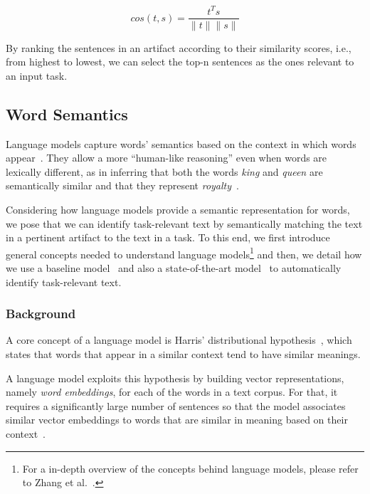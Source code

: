 \begin{equation}
    cos(t,s) = \frac{t^Ts}{\|t\| \|s\|}
    \label{eq:lex-sim}
\end{equation}
\smallskip

By ranking the sentences in an artifact according to their similarity scores, i.e., from highest to lowest,
we can  select the top-n sentences as the ones relevant to an input task.




\subsection{Word Semantics}


Language models capture words' semantics based on the context in which words appear~\cite{harris1954distributional}.
They allow a more ``human-like reasoning'' even when words are lexically different, as in 
inferring that both the words \textit{king} and \textit{queen} are semantically similar and that they represent \textit{royalty}~\cite{Mikolov2013}.


Considering how language models provide a semantic representation for words, we pose that we can identify task-relevant text by semantically matching the text in a pertinent artifact to the text in a task.
To this end, we first introduce general concepts needed to understand language models\footnote{
    For a in-depth overview of the concepts behind language models, please refer to Zhang et al.~\cite{zhang2021deep-learning}.
} and then, we detail how we use a baseline model~\cite{Mikolov2013} and also a state-of-the-art model~\cite{Devlin2018Bert} to automatically identify task-relevant text.





\subsubsection{Background}


A core concept of a language model is Harris' distributional hypothesis~\cite{harris1954distributional}, which states that words that appear in a similar context tend to have similar meanings.


A language model exploits this hypothesis by building vector representations, namely \textit{word embeddings}, for each of the words in a text corpus.
For that, it requires a significantly large number of sentences so that
the model associates similar vector embeddings to words that are similar in meaning based on their context~\cite{Ye2016}. 

